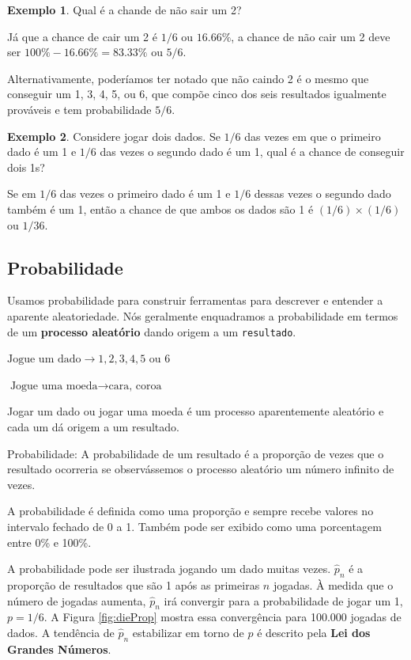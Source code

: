 \documentclass[
]{book}
\theoremstyle{definition}
\theoremstyle{definition}
\newtheorem{example}{Exemplo}[chapter]
\theoremstyle{definition}
\theoremstyle{definition}
\theoremstyle{remark}
\begin{document}
\begin{example}
\protect\hypertarget{exm:probNot2}{}{\label{exm:probNot2} }Qual é a chande de não sair um 2?
\end{example}

Já que a chance de cair um 2 é \(1/6\) ou \(16.66\%\), a chance de não cair um 2 deve ser \(100\% - 16.66\% = 83.33\%\) ou \(5/6\).

Alternativamente, poderíamos ter notado que não caindo 2 é o mesmo que conseguir um 1, 3, 4, 5, ou 6, que compõe cinco dos seis resultados igualmente prováveis e tem probabilidade \(5/6\).

\begin{example}
\protect\hypertarget{exm:probOf2Ones}{}{\label{exm:probOf2Ones} }Considere jogar dois dados. Se \(1/6\) das vezes em que o primeiro dado é um 1 e \(1/6\) das vezes o segundo dado é um 1, qual é a chance de conseguir dois 1s?
\end{example}

Se em \(1/6\) das vezes o primeiro dado é um 1 e \(1/6\) dessas vezes o segundo dado também é um 1, então a chance de que ambos os dados são 1 é \((1/6)\times (1/6)\) ou \(1/36\).

\hypertarget{probability}{%
\subsection{Probabilidade}\label{probability}}

Usamos probabilidade para construir ferramentas para descrever e entender a aparente aleatoriedade. Nós geralmente enquadramos a probabilidade em termos de um \textbf{processo aleatório} dando origem a um \texttt{resultado}.

\(\text{Jogue um dado} \longrightarrow 1, 2, 3, 4, 5 \text{ ou } 6\)

\(\text{Jogue uma moeda} \longrightarrow \text{cara, coroa}\)

Jogar um dado ou jogar uma moeda é um processo aparentemente aleatório e cada um dá origem a um resultado.

Probabilidade: A probabilidade de um resultado é a proporção de vezes que o resultado ocorreria se observássemos o processo aleatório um número infinito de vezes.

A probabilidade é definida como uma proporção e sempre recebe valores no intervalo fechado de 0 a 1. Também pode ser exibido como uma porcentagem entre 0\% e 100\%.

A probabilidade pode ser ilustrada jogando um dado muitas vezes. \(\hat{p}_n\) é a proporção de resultados que são 1 após as primeiras \(n\) jogadas. À medida que o número de jogadas aumenta, \(\hat{p}_n\) irá convergir para a probabilidade de jogar um 1, \(p = 1/6\). A Figura \ref{fig:dieProp} mostra essa convergência para 100.000 jogadas de dados. A tendência de \(\hat{p}_n\) estabilizar em torno de \(p\) é descrito pela \textbf{Lei dos Grandes Números}.
\end{document}
